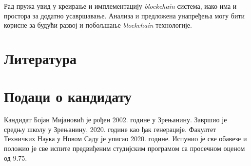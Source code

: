 \documentclass[12pt, a4paper]{article}
\begin{document}
Рад пружа увид у креирање и имплементацију \textit{blockchain} система, иако има и простора за додатно усавршавање. Анализа и предложена унапређења могу бити корисне за будући развој и побољшање \textit{blockchain} технологије.


\pagebreak
\section{Литература}
\renewcommand{\refname}{}
\vspace{-\parskip} %
\vspace{-\parskip} %
\vspace{-\parskip} %
\vspace{-\parskip} %
\setlength{\bibsep}{8pt}



\pagebreak
\section{Подаци о кандидату}
Кандидат Бојан Мијановић је рођен 2002. године у Зрењанину. Завршио је средњу школу у Зрењанину, 2020. године као ђак генерације. Факултет Техничких Наука у Новом Саду је уписао 2020. године. Испунио је све обавезе и положио је све испите предвиђеним студијским програмом са просечном оценом од 9.75.
\end{document}
